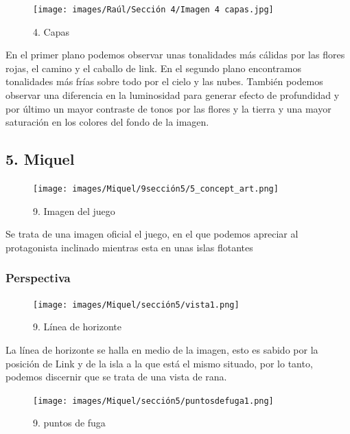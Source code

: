 \documentclass[12pt]{article}
\begin{document}
\begin{figure}[H]
      \centering
      \texttt{[image: images/Raúl/Sección 4/Imagen 4 capas.jpg]}
      \caption{\small 4. Capas}
\end{figure}

 En el primer plano podemos observar unas tonalidades más cálidas por las flores rojas, el camino y el caballo de link. En el segundo plano encontramos tonalidades más frías sobre todo por el cielo y las nubes. También podemos observar una diferencia en la luminosidad para generar efecto de profundidad y por último un mayor contraste de tonos por las flores y la tierra y una mayor saturación en los colores del fondo de la imagen.


        \newpage


    \subsection{5. Miquel}
        \begin{figure}[H]
      \centering
      \texttt{[image: images/Miquel/9sección5/5\_concept\_art.png]}
      \caption{\small 9. Imagen del juego}
    \end{figure}

    Se trata de una imagen oficial el juego, en el que podemos apreciar al protagonista inclinado mientras esta en unas islas flotantes

        \subsubsection{Perspectiva}

    \begin{figure}[H]
      \centering
      \texttt{[image: images/Miquel/sección5/vista1.png]}
      \caption{\small 9. Línea de horizonte}
    \end{figure}

    La línea de horizonte se halla en medio de la imagen, esto es sabido por la posición de Link y de la isla a la que está el mismo situado, por lo tanto, podemos discernir que se trata de una vista de rana.


    \begin{figure}[H]
      \centering
      \texttt{[image: images/Miquel/sección5/puntosdefuga1.png]}
      \caption{\small 9. puntos de fuga}
    \end{figure}
\end{document}
